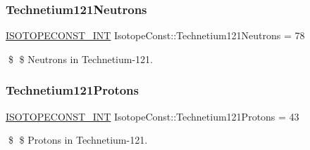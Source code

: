 \subsubsection{\texorpdfstring{Technetium121\+Neutrons}{Technetium121Neutrons}}
{\footnotesize\ttfamily \mbox{\hyperlink{group___isotope_const-_macros_ga5f18360b3e99483a35c32d789e62621c}{I\+S\+O\+T\+O\+P\+E\+C\+O\+N\+S\+T\+\_\+\+I\+NT}} Isotope\+Const\+::\+Technetium121\+Neutrons = 78}

\$ \$ Neutrons in Technetium-\/121. \mbox{\label{group___isotope_const-_technetium-_tc121_gaaf7321fb8ff0ea17a1a24c8c55e7e668}} 
\subsubsection{\texorpdfstring{Technetium121\+Protons}{Technetium121Protons}}
{\footnotesize\ttfamily \mbox{\hyperlink{group___isotope_const-_macros_ga5f18360b3e99483a35c32d789e62621c}{I\+S\+O\+T\+O\+P\+E\+C\+O\+N\+S\+T\+\_\+\+I\+NT}} Isotope\+Const\+::\+Technetium121\+Protons = 43}

\$ \$ Protons in Technetium-\/121. 